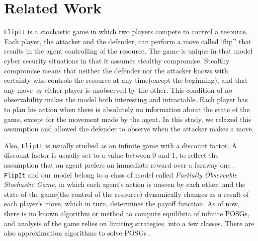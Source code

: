 \documentclass[11pt]{article}
\theoremstyle{plain}
\begin{document}
\section{Related Work}



\texttt{FlipIt} is a stochastic game in which two players 
compete to control a resource\cite{Dijk:2013:FGS:2722894.2723058}. Each player, the attacker and the defender, can perform a move called `flip'' that results in the agent controlling of the resource. The game is unique in that model cyber security situations in that it assumes stealthy compromise. Stealthy compromise means that neither the defender nor the attacker knows with certainty who controls the resource at any time(except the beginning), and that any move by either player is unobserved by the other. This condition of no observability makes the model both interesting and intractable. Each player has to plan his action when there is absolutely no information about the state of the game, except for the movement made by the agent. In this study, we relaxed this assumption and allowed the defender to observe when the attacker makes a move.

Also, \texttt{FlipIt} is usually studied as an infinite game with a discount factor. A discount factor is usually set to a value between 0 and 1, to reflect the assumption that an agent prefers an immediate reward over a faraway one \cite{Mailath0}. \texttt{FlipIt} and our model belong to a class of model called \textit{Partially Observable Stochastic Game}, in which each agent's action is unseen by each other, and the state of the game(the control of the resource) dynamically changes as a result of each player's move, which in turn, determines the payoff function. As of now, there is no known algorithm or method to compute equilibria of infinite POSGs, and analysis of the game relies on limiting strategies. into a few classes. There are also approximation algorithms to solve POSGs \cite{Hansen1} \cite{Kumar1}.
\end{document}
